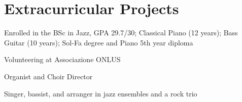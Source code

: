 \documentclass[]{deedy-resume-reversed}
\begin{document}
\begin{minipage}[t]{0.60\textwidth}
\section{Extracurricular Projects}
\vspace{\topsep}
\begin{tightemize}
\item Enrolled in the BSc in Jazz, GPA 29.7/30; Classical Piano (12 years); Bass Guitar (10 years); Sol-Fa degree and Piano 5th year diploma
\item Volunteering at Associazione  ONLUS
\item Organist and Choir Director
\item Singer, bassist, and arranger in jazz ensembles and a rock trio
\end{tightemize}
\sectionsep









\end{minipage}
\end{document}
